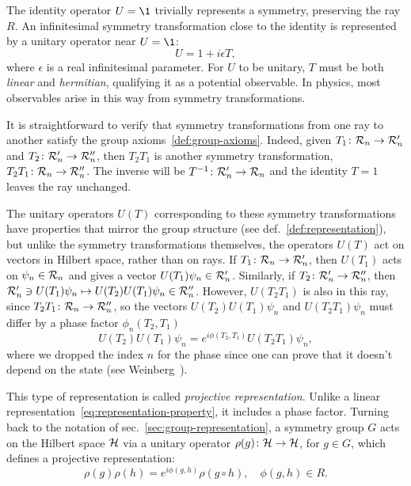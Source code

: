 The identity operator $U = \1$ trivially represents a symmetry, preserving the ray $R$. An infinitesimal symmetry transformation close to the identity is represented by a unitary operator near $U = \1$:
\begin{equation}
    U = 1 + i \epsilon T ,
\end{equation}
where $\epsilon$ is a real infinitesimal parameter. For $U$ to be unitary, $T$ must be both \emph{linear} and \emph{hermitian}, qualifying it as a potential observable. In physics, most observables arise in this way from symmetry transformations.

It is straightforward to verify that symmetry transformations from one ray to another satisfy the group axioms~\ref{def:group-axioms}. Indeed, given $T_1 \colon \mathcal{R}_n \to \mathcal{R}'_n$ and $T_2 \colon \mathcal{R}'_n \to \mathcal{R}''_n$, then $T_2 T_1$ is another symmetry transformation, $T_2 T_1 \colon \mathcal{R}_n \to \mathcal{R}''_n$. The inverse will be $T^{-1} \colon \mathcal{R}'_n \to \mathcal{R}_n$ and the identity $T=1$ leaves the ray unchanged.

The unitary operators $U(T)$ corresponding to these symmetry transformations have properties that mirror the group structure (see def.~\ref{def:representation}), but unlike the symmetry transformations themselves, the operators $U(T)$ act on vectors in Hilbert space, rather than on rays. If $T_1 \colon \mathcal{R}_n \to \mathcal{R}'_n$, then $U(T_1)$ acts on $\psi_n \in \mathcal{R}_n$ and gives a vector $U(T_1)\psi_n \in \mathcal{R}'_n$. Similarly, if $T_2 \colon \mathcal{R}'_n \to \mathcal{R}''_n$, then $\mathcal{R}'_n \ni U(T_1)\psi_n \mapsto U(T_2)U(T_1)\psi_n \in \mathcal{R}''_n$. However, $U(T_2 T_1)$ is also in this ray, since $T_2 T_1 \colon \mathcal{R}_n \to \mathcal{R}''_n$, so the vectors $U(T_2)U(T_1)\psi_n$ and $U(T_2T_1)\psi_n$ must differ by a phase factor $\phi_n (T_2, T_1)$
\begin{equation}
    U(T_2)U(T_1)\psi_n = e^{i\phi (T_2, T_1)} U(T_2T_1)\psi_n ,
\end{equation}
where we dropped the index $n$ for the phase since one can prove that it doesn't depend on the state (see Weinberg~\cite{weinberg}).

This type of representation is called \emph{projective representation}. Unlike a linear representation~\eqref{eq:representation-property}, it includes a phase factor. Turning back to the notation of sec.~\ref{sec:group-representation}, a symmetry group $G$ acts on the Hilbert space $\mathcal{H}$ via a unitary operator $\rho(g) \colon \mathcal{H} \to \mathcal{H}$, for $g \in G$, which defines a projective representation:
\begin{equation}
    \rho(g) \rho(h) = e^{i\phi(g,h)} \rho(g \circ h), \quad \phi(g,h) \in R.
\end{equation}

